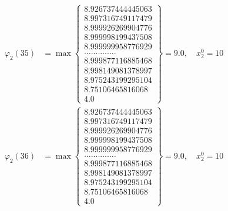 \documentclass{article}
\begin{document}
\begin{align*}
  
  
  
\varphi_{2}(35) &= \max \left\{ \begin{array}{c}
8.926737444445063 \\
 8.997316749117479 \\
 8.999926269904776 \\
 8.999998199437508 \\
 8.999999958776929 \\
 .............. \\
 8.999877116885468 \\
 8.998149081378997 \\
 8.975243199295104 \\
 8.75106465816068 \\
 4.0
\end{array} \right\} = 9.0, \quad x_{2}^0 = 10\\
  
  
  
  
\varphi_{2}(36) &= \max \left\{ \begin{array}{c}
8.926737444445063 \\
 8.997316749117479 \\
 8.999926269904776 \\
 8.999998199437508 \\
 8.999999958776929 \\
 .............. \\
 8.999877116885468 \\
 8.998149081378997 \\
 8.975243199295104 \\
 8.75106465816068 \\
 4.0
\end{array} \right\} = 9.0, \quad x_{2}^0 = 10\\
  
  
\end{align*}
\end{document}
